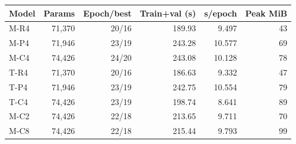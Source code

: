 \begin{tabular}{lrrrrr}
\toprule
Model & Params & Epoch/best & Train+val (s) & s/epoch & Peak MiB\\
\midrule
M-R4 & 71,370 & 20/16 & 189.93 & 9.497 & 43\\
M-P4 & 71,946 & 23/19 & 243.28 & 10.577 & 69\\
M-C4 & 74,426 & 24/20 & 243.08 & 10.128 & 78\\
T-R4 & 71,370 & 20/16 & 186.63 & 9.332 & 47\\
T-P4 & 71,946 & 23/19 & 242.75 & 10.554 & 79\\
T-C4 & 74,426 & 23/19 & 198.74 & 8.641 & 89\\
M-C2 & 74,426 & 22/18 & 213.65 & 9.711 & 70\\
M-C8 & 74,426 & 22/18 & 215.44 & 9.793 & 99\\
\bottomrule
\end{tabular}

